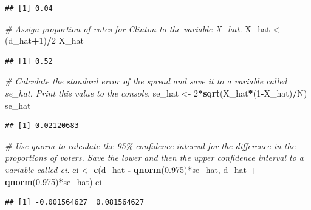 \documentclass[
]{article}
\newenvironment{Shaded}{\begin{snugshade}}{\end{snugshade}}
\newcommand{\CommentTok}[1]{\textcolor[rgb]{0.56,0.35,0.01}{\textit{#1}}}
\newcommand{\DecValTok}[1]{\textcolor[rgb]{0.00,0.00,0.81}{#1}}
\newcommand{\FloatTok}[1]{\textcolor[rgb]{0.00,0.00,0.81}{#1}}
\newcommand{\KeywordTok}[1]{\textcolor[rgb]{0.13,0.29,0.53}{\textbf{#1}}}
\newcommand{\NormalTok}[1]{#1}
\newcommand{\OperatorTok}[1]{\textcolor[rgb]{0.81,0.36,0.00}{\textbf{#1}}}
\newcommand{\StringTok}[1]{\textcolor[rgb]{0.31,0.60,0.02}{#1}}
\begin{document}
\begin{verbatim}
## [1] 0.04
\end{verbatim}

\begin{Shaded}
\begin{Highlighting}[]
\CommentTok{\# Assign proportion of votes for Clinton to the variable \textasciigrave{}X\_hat\textasciigrave{}.}
\NormalTok{X\_hat \textless{}{-}}\StringTok{ }\NormalTok{(d\_hat}\OperatorTok{+}\DecValTok{1}\NormalTok{)}\OperatorTok{/}\DecValTok{2}
\NormalTok{X\_hat}
\end{Highlighting}
\end{Shaded}

\begin{verbatim}
## [1] 0.52
\end{verbatim}

\begin{Shaded}
\begin{Highlighting}[]
\CommentTok{\# Calculate the standard error of the spread and save it to a variable called \textasciigrave{}se\_hat\textasciigrave{}. Print this value to the console.}
\NormalTok{se\_hat \textless{}{-}}\StringTok{ }\DecValTok{2}\OperatorTok{*}\KeywordTok{sqrt}\NormalTok{(X\_hat}\OperatorTok{*}\NormalTok{(}\DecValTok{1}\OperatorTok{{-}}\NormalTok{X\_hat)}\OperatorTok{/}\NormalTok{N)}
\NormalTok{se\_hat}
\end{Highlighting}
\end{Shaded}

\begin{verbatim}
## [1] 0.02120683
\end{verbatim}

\begin{Shaded}
\begin{Highlighting}[]
\CommentTok{\# Use \textasciigrave{}qnorm\textasciigrave{} to calculate the 95\% confidence interval for the difference in the proportions of voters. Save the lower and then the upper confidence interval to a variable called \textasciigrave{}ci\textasciigrave{}.}
\NormalTok{ci \textless{}{-}}\StringTok{ }\KeywordTok{c}\NormalTok{(d\_hat }\OperatorTok{{-}}\StringTok{ }\KeywordTok{qnorm}\NormalTok{(}\FloatTok{0.975}\NormalTok{)}\OperatorTok{*}\NormalTok{se\_hat, d\_hat }\OperatorTok{+}\StringTok{ }\KeywordTok{qnorm}\NormalTok{(}\FloatTok{0.975}\NormalTok{)}\OperatorTok{*}\NormalTok{se\_hat)}
\NormalTok{ci}
\end{Highlighting}
\end{Shaded}

\begin{verbatim}
## [1] -0.001564627  0.081564627
\end{verbatim}
\end{document}
